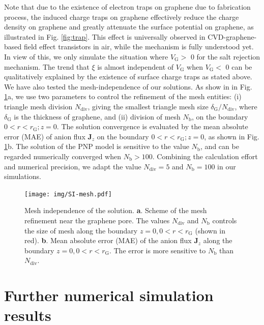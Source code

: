 \documentclass[manuscript=suppinfo,email=true, hyperref=true, keywords=false]{achemso}
\newcommand{\Fig}{Fig.}
\begin{document}
Note that due to the existence of electron traps on graphene due to
fabrication process, the induced charge traps on graphene effectively
reduce the charge density on graphene and greatly attenuate the
surface potential on graphene, as illustrated in \Fig
\ref{fig:trap}. This effect is universally observed in
CVD-graphene-based field effect transistors in air, while the
mechanism is fully understood yet. In view of this, we only simulate
the situation where $V_{\mathrm{G}}>$ 0 for the salt rejection
mechanism. The trend that $\xi$ is almost independent of
$V_{\mathrm{G}}$ when $V_{\mathrm{G}}<$ 0 can be qualitatively
explained by the existence of surface charge traps as stated above.
We have also tested the mesh-independence of our solutions. As show in
in \Fig{} \ref{fig:mesh}a, we use two parameters to control the
refinement of the mesh entities: (i) triangle mesh division
$N_{\mathrm{div}}$, giving the smallest triangle mesh size
$\delta_{\mathrm{G}} / N_{\mathrm{div}}$, where $\delta_{\mathrm{G}}$
is the thickness of graphene, and (ii) division of mesh
$N_{\mathrm{b}}$, on the boundary $0<r<r_{\mathrm{G}};z=0$. The
solution convergence is evaluated by the mean absolute error (MAE) of
anion flux $\boldsymbol{J}_{z}$ on the boundary
$0<r<r_{\mathrm{G}};z=0$, as shown in \Fig{}
\ref{fig:mesh}b. The solution of the PNP model is sensitive to the
value $N_{\mathrm{b}}$, and can be regarded numerically converged when
$N_{\mathrm{b}}>100$. Combining the calculation effort and numerical
precision, we adapt the value $N_{\mathrm{div}}=5$ and
$N_{\mathrm{b}}=100$ in our simulations.

\begin{figure}[htbp]
  \centering
  \texttt{[image: img/SI-mesh.pdf]}
  \caption{Mesh independence of the solution. \textbf{a}. Scheme of
    the mesh refinement near the graphene pore. The values
    $N_{\mathrm{div}}$ and $N_{\mathrm{b}}$ controls the size of mesh
    along the boundary $z=0, 0<r<r_{\mathrm{G}}$ (shown in
    red). \textbf{b}. Mean absolute error (MAE) of the anion flux
    $\boldsymbol{J}_{z}$ along the boundary $z=0,
    0<r<r_{\mathrm{G}}$. The error is more sensitive to
    $N_{\mathrm{b}}$ than $N_{\mathrm{div}}$.}
  \label{fig:mesh}
\end{figure}

\section{Further numerical simulation results}
\label{sec:simu-res}
\end{document}
